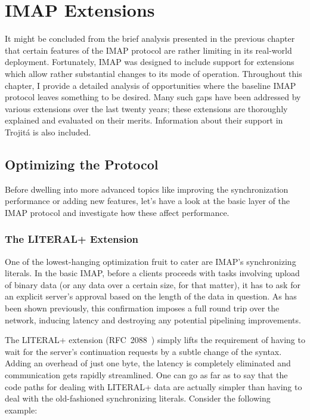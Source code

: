 \documentclass[trojita]{subfiles}
\begin{document}
\chapter{IMAP Extensions}
\label{sec:imap-extensions}

It might be concluded from the brief analysis presented in the previous chapter that certain features of the IMAP
protocol are rather limiting in its real-world deployment.  Fortunately, IMAP was designed to include support for
extensions which allow rather substantial changes to its mode of operation.  Throughout this chapter, I provide a
detailed analysis of opportunities where the baseline IMAP protocol leaves something to be desired.  Many such gaps have
been addressed by various extensions over the last twenty years; these extensions are thoroughly explained and evaluated
on their merits.  Information about their support in Trojitá is also included.

\section{Optimizing the Protocol}

Before dwelling into more advanced topics like improving the synchronization performance or adding new features, let's
have a look at the basic layer of the IMAP protocol and investigate how these affect performance.

\subsection{The LITERAL+ Extension}
\label{sec:imap-literalplus}

One of the lowest-hanging optimization fruit to cater are IMAP's synchronizing literals.  In the basic IMAP, before a
clients proceeds with tasks involving upload of binary data (or any data over a certain size, for that matter), it has
to ask for an explicit server's approval based on the length of the data in question.  As has been shown previously,
this confirmation imposes a full round trip over the network, inducing latency and destroying any potential pipelining
improvements.

The LITERAL+ extension (RFC~2088~\cite{rfc2088}) simply lifts the requirement of having to wait for the server's
continuation requests by a subtle change of the syntax.  Adding an overhead of just one byte, the latency is completely
eliminated and communication gets rapidly streamlined.  One can go as far as to say that the code paths for dealing with
LITERAL+ data are actually simpler than having to deal with the old-fashioned synchronizing literals.  Consider the
following example:
\end{document}
